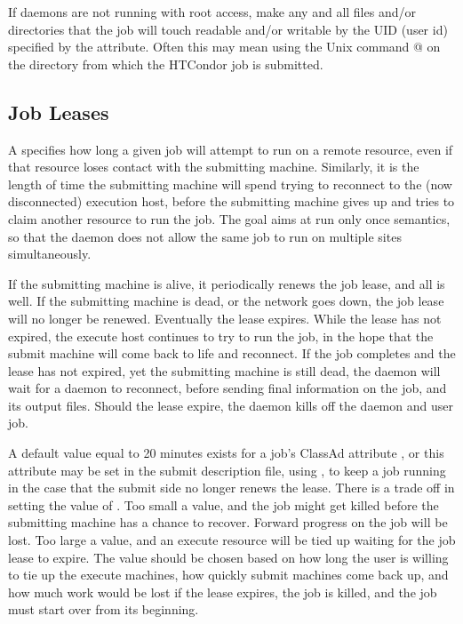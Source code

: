 If daemons are not running with root access, 
make any and all files
and/or directories that the job will touch readable and/or writable by
the UID (user id) specified by the  attribute.
Often this may
mean using the Unix command @
on the directory from which the HTCondor job is submitted.

\subsection{\label{sec:Job-Lease}
Job Leases}

A  specifies how long a given job will attempt to run
on a remote resource,
even if that resource loses contact with the submitting machine.
Similarly, it is the length of time the submitting machine will
spend trying to reconnect to the (now disconnected) execution host,
before the submitting machine gives up and tries to claim
another resource to run the job.
The goal aims at run only once semantics,
so that the  daemon does not allow the same job
to run on multiple sites simultaneously.

If the submitting machine is alive,
it periodically renews the job lease,
and all is well.
If the submitting machine is dead,
or the network goes down, the job lease will no longer be renewed.
Eventually the lease expires.
While the lease has not expired,
the execute host continues to try to run the job,
in the hope that the submit machine will come back to life
and reconnect.
If the job completes and the lease has not expired, yet the 
submitting machine is still dead,
the  daemon will wait for a
 daemon to reconnect, 
before sending final information on the job,
and its output files.
Should the lease expire, the  daemon
kills off the  daemon and user job.

A default value equal to 20 minutes exists for a job's
ClassAd attribute , 
or this attribute may be set in the submit description file,
using ,
to keep a job running in the case that the submit side no longer
renews the lease.
There is a trade off in setting the value of . 
Too small a value,
and the job might get killed before the submitting machine has a
chance to recover.
Forward progress on the job will be lost.
Too large a value,
and an execute resource will be tied up waiting for the job lease to expire.
The value should be chosen based on how long the user is willing to tie up
the execute machines, how quickly submit machines come  back up,
and how much work would be lost if the lease expires,
the job is killed, and the job must start over from its beginning.

